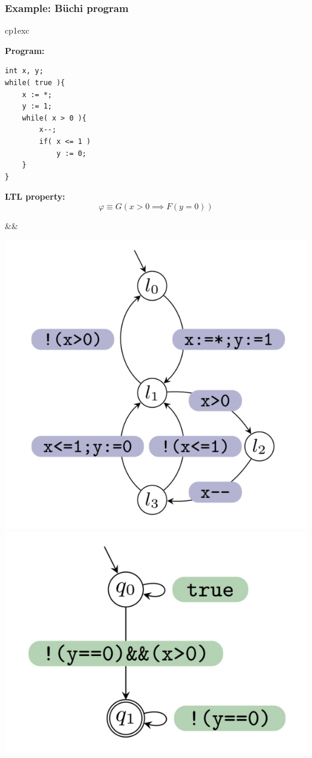 \documentclass[xcolor=dvipsnames]{beamer}
\begin{document}
\begin{frame}[fragile]
    \frametitle{Example: Büchi program}
\begin{tabular}{cp{1ex}c}
  \begin{minipage}{.40\linewidth}
\textbf{Program:}
\begin{lstlisting}
int x, y;
while( true ){
    x := *;
    y := 1;
    while( x > 0 ){
        x--;
        if( x <= 1 )
            y := 0;
    }
}
\end{lstlisting}
\textbf{LTL property:}
\[
    \varphi \equiv G(x > 0 \implies F(y = 0))
\]
  \end{minipage}
&&
  \begin{minipage}{.55\linewidth}
    \includegraphics[width=\textwidth,height=0.5\textheight,keepaspectratio]{code.jpg} \\

    \includegraphics[width=\textwidth,height=0.35\textheight,keepaspectratio]{buchi.jpg}
  \end{minipage}
\end{tabular}
\end{frame}
\end{document}
